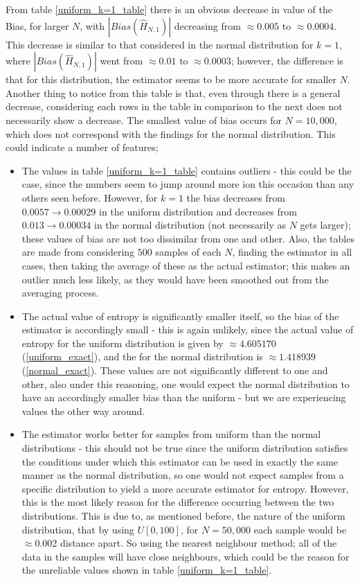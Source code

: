 \documentclass{article}
\begin{document}
From table \ref{uniform_k=1_table} there is an obvious decrease in value of the Bias, for larger $N$, with $|Bias(\hat{H}_{N, 1})|$ decreasing from $\approx 0.005$ to $\approx 0.0004$. This decrease is similar to that considered in the normal distribution for $k=1$, where $|Bias(\hat{H}_{N, 1})|$ went from $\approx 0.01$ to $\approx 0.0003$; however, the difference is that for this distribution, the estimator seems to be more accurate for smaller $N$. Another thing to notice from this table is that, even through there is a general decrease, considering each rows in the table in comparison to the next does not necessarily show a decrease. The smallest value of bias occurs for $N=10,000$, which does not correspond with the findings for the normal distribution. This could indicate a number of features;

\begin{itemize}
\item The values in table \ref{uniform_k=1_table} contains outliers - this could be the case, since the numbers seem to jump around more ion this occasion than any others seen before. However, for $k=1$ the bias decreases from $0.0057 \to 0.00029$ in the uniform distribution and decreases from $0.013 \to 0.00034$ in the normal distribution (not necessarily as $N$ gets larger); these values of bias are not too dissimilar from one and other. Also, the tables are made from considering $500$ samples of each $N$, finding the estimator in all cases, then taking the average of these as the actual estimator; this makes an outlier much less likely, as they would have been smoothed out from the averaging process.

\item The actual value of entropy is significantly smaller itself, so the bias of the estimator is accordingly small - this is again unlikely, since the actual value of entropy for the uniform distribution is given by $\approx 4.605170$ (\ref{uniform_exact}), and the for the normal distribution is $\approx 1.418939$ (\ref{normal_exact}). These values are not significantly different to one and other, also under this reasoning, one would expect the normal distribution to have an accordingly smaller bias than the uniform - but we are experiencing values the other way around.

\item The estimator works better for samples from uniform than the normal distributions - this should not be true since the uniform distribution satisfies the conditions under which this estimator can be used in exactly the same manner as the normal distribution, so one would not expect samples from a specific distribution to yield a more accurate estimator for entropy. However, this is the most likely reason for the difference occurring between the two distributions. This is due to, as mentioned before, the nature of the uniform distribution, that by using $U[0, 100]$, for $N=50,000$ each sample would be $\approx 0.002$ distance apart. So using the nearest neighbour method; all of the data in the samples will have close neighbours, which could be the reason for the unreliable values shown in table \ref{uniform_k=1_table}.
\end{itemize}
\end{document}
